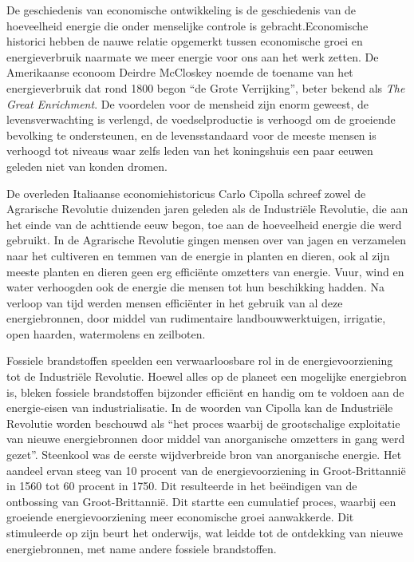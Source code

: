 \begin{blockquotebox}
    De geschiedenis van economische ontwikkeling is de geschiedenis van de hoeveelheid energie die onder menselijke controle is gebracht.Economische historici hebben de nauwe relatie opgemerkt tussen economische groei en energieverbruik naarmate we meer energie voor ons aan het werk zetten. De Amerikaanse econoom Deirdre McCloskey noemde de toename van het energieverbruik dat rond 1800 begon ``de Grote Verrijking'', beter bekend als \textit{The Great Enrichment}. De voordelen voor de mensheid zijn enorm geweest, de levensverwachting is verlengd, de voedselproductie is verhoogd om de groeiende bevolking te ondersteunen, en de levensstandaard voor de meeste mensen is verhoogd tot niveaus waar zelfs leden van het koningshuis een paar eeuwen geleden niet van konden dromen.
    \par\vspace{1em}\noindent
    De overleden Italiaanse economiehistoricus Carlo Cipolla schreef zowel de Agrarische Revolutie duizenden jaren geleden als de Industriële Revolutie, die aan het einde van de achttiende eeuw begon, toe aan de hoeveelheid energie die werd gebruikt. In de Agrarische Revolutie gingen mensen over van jagen en verzamelen naar het cultiveren en temmen van de energie in planten en dieren, ook al zijn meeste planten en dieren geen erg efficiënte omzetters van energie. Vuur, wind en water verhoogden ook de energie die mensen tot hun beschikking hadden. Na verloop van tijd werden mensen efficiënter in het gebruik van al deze energiebronnen, door middel van rudimentaire landbouwwerktuigen, irrigatie, open haarden, watermolens en zeilboten.
    \par\vspace{1em}\noindent
    Fossiele brandstoffen speelden een verwaarloosbare rol in de energievoorziening tot de Industriële Revolutie. Hoewel alles op de planeet een mogelijke energiebron is, bleken fossiele brandstoffen bijzonder efficiënt en handig om te voldoen aan de energie-eisen van industrialisatie. In de woorden van Cipolla kan de Industriële Revolutie worden beschouwd als ``het proces waarbij de grootschalige exploitatie van nieuwe energiebronnen door middel van anorganische omzetters in gang werd gezet''. Steenkool was de eerste wijdverbreide bron van anorganische energie. Het aandeel ervan steeg van 10 procent van de energievoorziening in Groot-Brittannië in 1560 tot 60 procent in 1750. Dit resulteerde in het beëindigen van de ontbossing van Groot-Brittannië. Dit startte een cumulatief proces, waarbij een groeiende energievoorziening meer economische groei aanwakkerde. Dit stimuleerde op zijn beurt het onderwijs, wat leidde tot de ontdekking van nieuwe energiebronnen, met name andere fossiele brandstoffen.

\end{blockquotebox}
